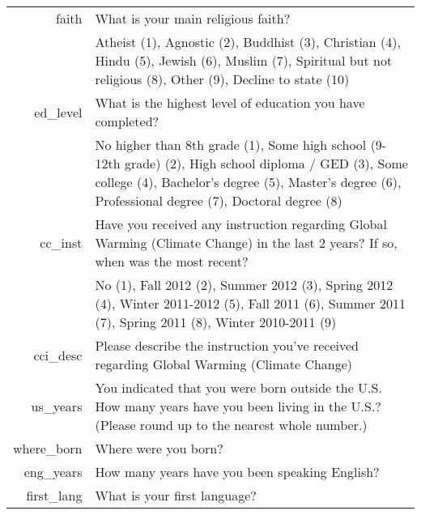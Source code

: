 \begin{longtabu}{rX}
faith & What is your main religious faith? \\
 & Atheist (1), Agnostic (2), Buddhist (3), Christian (4), Hindu (5), Jewish (6),
Muslim (7), Spiritual but not religious (8), Other (9), Decline to state (10) \\

ed_level & What is the highest level of education you have completed? \\
 & No higher than 8th grade (1), Some high school (9-12th grade) (2), High
 school diploma / GED (3), Some college (4), Bachelor's degree (5), Master's
 degree (6), Professional degree (7), Doctoral degree (8) \\

cc_inst & Have you received any instruction regarding Global Warming (Climate
Change) in the last 2 years? If so, when was the most recent? \\
 & No (1), Fall 2012 (2), Summer 2012 (3), Spring 2012 (4), Winter 2011-2012
 (5), Fall  2011 (6), Summer 2011 (7), Spring  2011 (8), Winter 2010-2011 (9) \\

cci_desc & Please describe the instruction you've received regarding Global
Warming (Climate Change) \\

us_years & You indicated that you were born outside the U.S. How many years have
you been living in the U.S.? (Please round up to the nearest whole number.) \\

where_born & Where were you born? \\

eng_years & How many years have you been speaking English? \\

first_lang & What is your first language? \\
\end{longtabu}

